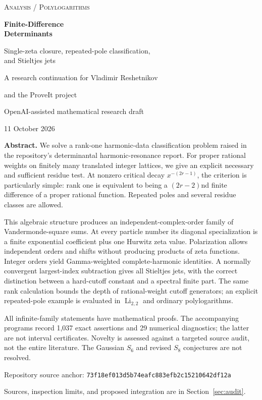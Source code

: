 \documentclass[11pt,letterpaper]{article}
\numberwithin{equation}{section}
\theoremstyle{definition}\newtheorem{definition}[theorem]{Definition}
\theoremstyle{remark}\newtheorem{remark}[theorem]{Remark}
\DeclareMathOperator{\Li}{Li}
\newcommand{\pin}{\texttt{73f18ef013d5b74eafc883efb2c15210642df12a}}
\begin{document}
\hypersetup{pageanchor=false}
\begin{titlepage}
\centering
\vspace*{0.8cm}
{\small\scshape Analysis / Polylogarithms\par}
\vspace{0.9cm}
{\huge\bfseries\color{ink} Finite-Difference\\[0.18em] Determinants\par}
\vspace{0.7cm}
{\Large Single-zeta closure, repeated-pole classification,\\[0.25em] and Stieltjes jets\par}
\vspace{0.8cm}
{\large A research continuation for Vladimir Reshetnikov\par}
{and the ProveIt project\par}
\vspace{0.25cm}
{OpenAI-assisted mathematical research draft\par}
{11 October 2026\par}
\vspace{0.8cm}
\begin{minipage}{0.92\textwidth}
\small
\textbf{Abstract.}
We solve a rank-one harmonic-data classification problem raised in the
repository's determinantal harmonic-resonance report. For proper rational
weights on finitely many translated integer lattices, we give an explicit
necessary and sufficient residue test. At nonzero critical decay
$x^{-(2r-1)}$, the criterion is particularly simple: rank one is equivalent
to being a $(2r-2)$nd finite difference of a proper rational function.
Repeated poles and several residue classes are allowed.

This algebraic structure produces an independent-complex-order family of
Vandermonde-square sums. At every particle number its diagonal specialization
is a finite exponential coefficient plus one Hurwitz zeta value. Polarization
allows independent orders and shifts without producing products of zeta
functions. Integer orders yield Gamma-weighted complete-harmonic identities.
A normally convergent largest-index subtraction gives all Stieltjes jets,
with the correct distinction between a hard-cutoff constant and a spectral
finite part. The same rank calculation bounds the depth of rational-weight
cutoff generators; an explicit repeated-pole example is evaluated in
$\Li_{2,2}$ and ordinary polylogarithms.

All infinite-family statements have mathematical proofs. The accompanying
programs record 1,037 exact assertions and 29 numerical diagnostics; the
latter are not interval certificates. Novelty is assessed against a targeted
source audit, not the entire literature. The Gaussian $S_6$ and revised
$S_8$ conjectures are not resolved.
\end{minipage}
\vfill
{\small Repository source anchor: \pin\par}
{\small Sources, inspection limits, and proposed integration are in Section~\ref{sec:audit}.\par}
\end{titlepage}
\end{document}
